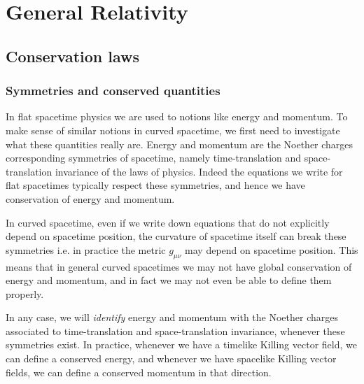 \chapter{General Relativity}


\section{Conservation laws}


\subsection{Symmetries and conserved quantities}


\begin{mytheorem}
In flat spacetime physics we are used to notions like energy and momentum.
To make sense of similar notions in curved spacetime, we first need to investigate what these quantities really are.
Energy and momentum are the Noether charges corresponding symmetries of spacetime, namely time-translation and space-translation invariance of the laws of physics.
Indeed the equations we write for flat spacetimes  typically respect these symmetries, and hence we have conservation of energy and momentum.

In curved spacetime, even if we write down equations that do not explicitly depend on spacetime position, the curvature of spacetime itself can break these symmetries i.e. in practice the metric $g_{\mu\nu}$ may depend on spacetime position.
This means that in general curved spacetimes we may not have global conservation of energy and momentum, and in fact we may not even be able to define them properly.

In any case, we will \emph{identify} energy and momentum with the Noether charges associated to time-translation and space-translation invariance, whenever these symmetries exist.
In practice, whenever we have a timelike Killing vector field, we can define a conserved energy, and whenever we have spacelike Killing vector fields, we can define a conserved momentum in that direction.
\end{mytheorem}



